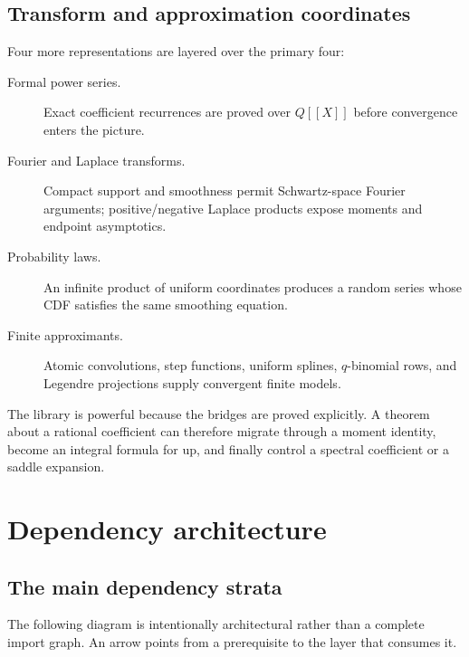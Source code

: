 \documentclass[11pt,a4paper,openany]{book}
\def\upfun{up}
\def\Q{Q}
\newcommand{\Q}{\ensuremath{\mathbb{Q}}}
\newcommand{\upfun}{\ensuremath{\operatorname{up}}}
\begin{document}
\section{Transform and approximation coordinates}
Four more representations are layered over the primary four:
\begin{description}
\item[Formal power series.] Exact coefficient recurrences are proved over
$\Q[\![X]\!]$ before convergence enters the picture.
\item[Fourier and Laplace transforms.] Compact support and smoothness permit
Schwartz-space Fourier arguments; positive/negative Laplace products expose
moments and endpoint asymptotics.
\item[Probability laws.] An infinite product of uniform coordinates produces a
random series whose CDF satisfies the same smoothing equation.
\item[Finite approximants.] Atomic convolutions, step functions, uniform
splines, $q$-binomial rows, and Legendre projections supply convergent finite
models.
\end{description}
The library is powerful because the bridges are proved explicitly.  A theorem
about a rational coefficient can therefore migrate through a moment identity,
become an integral formula for \upfun, and finally control a spectral
coefficient or a saddle expansion.

\chapter{Dependency architecture}
\label{ch:architecture}

\section{The main dependency strata}
The following diagram is intentionally architectural rather than a complete
import graph.  An arrow points from a prerequisite to the layer that consumes
it.
\end{document}

